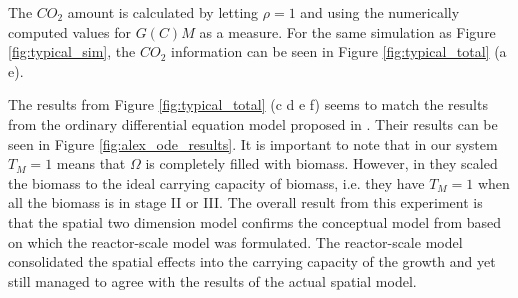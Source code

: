 The $CO_2$ amount is calculated by letting $\rho = 1$ and using the numerically computed values for $G(C)M$ as a measure.
For the same simulation as Figure \ref{fig:typical_sim}, the $CO_2$ information can be seen in Figure \ref{fig:typical_total} (a e).

The results from Figure \ref{fig:typical_total} (c d e f) seems to match the results from the ordinary differential equation model proposed in \cite{dumitrache2014understanding}.
Their results can be seen in Figure \ref{fig:alex_ode_results}.
It is important to note that in our system $T_M = 1 $ means that $\Omega$ is completely filled with biomass.
However, in \cite{dumitrache2015mathematicalModeling} they scaled the biomass to the ideal carrying capacity of biomass, i.e. they have $T_M = 1$ when all the biomass is in stage II or III.
The overall result from this experiment is that the spatial two dimension model confirms the conceptual model from \cite{dumitrache2015mathematicalModeling} based on which the reactor-scale model was formulated.
The reactor-scale model consolidated the spatial effects into the carrying capacity of the growth and yet still managed to agree with the results of the actual spatial model.

